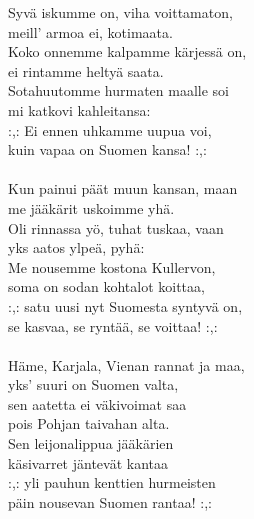 
Syvä iskumme on, viha voittamaton, \\ meill' armoa ei, kotimaata. \\ Koko onnemme kalpamme kärjessä on, \\ ei rintamme heltyä saata. \\ Sotahuutomme hurmaten maalle soi \\ mi katkovi kahleitansa: \\ :,: Ei ennen uhkamme uupua voi, \\ kuin vapaa on Suomen kansa! :,: \\ \hspace{10mm} \\ Kun painui päät muun kansan, maan \\ me jääkärit uskoimme yhä. \\ Oli rinnassa yö, tuhat tuskaa, vaan \\ yks aatos ylpeä, pyhä: \\ Me nousemme kostona Kullervon, \\ soma on sodan kohtalot koittaa, \\ :,: satu uusi nyt Suomesta syntyvä on, \\ se kasvaa, se ryntää, se voittaa! :,: \\ \hspace{10mm} \\ Häme, Karjala, Vienan rannat ja maa, \\ yks' suuri on Suomen valta, \\ sen aatetta ei väkivoimat saa \\ pois Pohjan taivahan alta. \\ Sen leijonalippua jääkärien \\ käsivarret jäntevät kantaa \\ :,: yli pauhun kenttien hurmeisten \\ päin nousevan Suomen rantaa! :,: